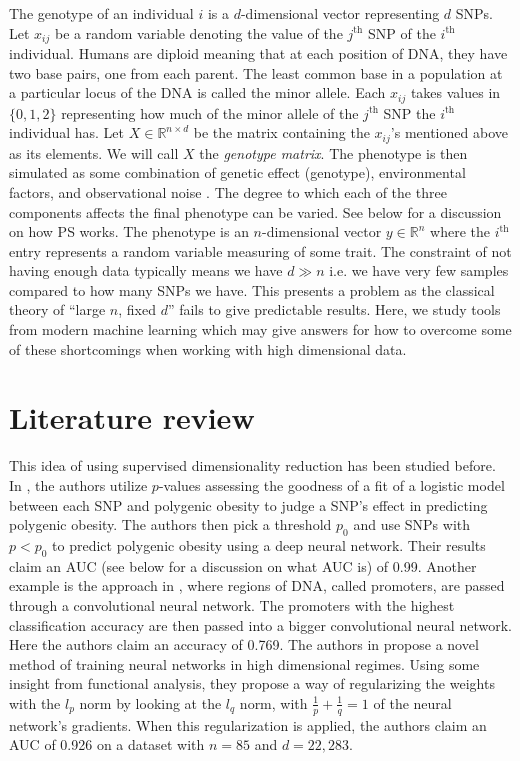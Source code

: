 \documentclass{article}
\begin{document}
The genotype of an individual \(i\) is a \(d\)-dimensional vector representing \(d\) SNPs. Let \(x_{ij}\) be a random variable denoting the value of the \(j^{\text{th}}\) SNP of the \(i^{\text{th}}\) individual. Humans are diploid meaning that at each position of DNA, they have two base pairs, one from each parent. The least common base in a population at a particular locus of the DNA is called the minor allele. Each \(x_{ij}\) takes values in \(\{0, 1, 2\}\) representing how much of the minor allele of the \(j^{\text{th}}\) SNP the \(i^{\text{th}}\) individual has. Let \( X \in \mathbb{R}^{n \times d} \) be the matrix containing the \(x_{ij}\)'s mentioned above as its elements. We will call \(X\) the \emph{genotype matrix}. The phenotype is then simulated as some combination of genetic effect (genotype), environmental factors, and observational noise \cite{PS}. The degree to which each of the three components affects the final phenotype can be varied. See below for a discussion on how PS works. The phenotype is an \(n\)-dimensional vector \( y\in\mathbb{R}^n\) where the \(i^{\text{th}}\) entry represents a random variable measuring of some trait.  The constraint of not having enough data typically means we have \(d \gg n\) i.e. we have very few samples compared to how many SNPs we have. This presents a problem as the classical theory of ``large \(n\), fixed \(d\)'' fails to give predictable results. Here, we study tools from modern machine learning which may give answers for how to overcome some of these shortcomings when working with high dimensional data.

\section{Literature review}
This idea of using supervised dimensionality reduction has been studied before. In \cite{montanez}, the authors utilize $p$-values assessing the goodness of a fit of a logistic model between each SNP and polygenic obesity to judge a SNP's effect in predicting polygenic obesity. The authors then pick a threshold $p_0$ and use SNPs with $p < p_0$ to predict polygenic obesity using a deep neural network. Their results claim an AUC (see below for a discussion on what AUC is) of 0.99. Another example is the approach in \cite{alsnet}, where regions of DNA, called promoters, are passed through a convolutional neural network. The promoters with the highest classification accuracy are then passed into a bigger convolutional neural network. Here the authors claim an accuracy of 0.769. The authors in \cite{liu} propose a novel method of training neural networks in high dimensional regimes. Using some insight from functional analysis, they propose a way of regularizing the weights with the $l_p$ norm by looking at the $l_q$ norm, with $\frac{1}{p} + \frac{1}{q} = 1$ of the neural network's gradients. When this regularization is applied, the authors claim an AUC of 0.926 on a dataset with $n=85$ and $d=22,283.$
\end{document}
